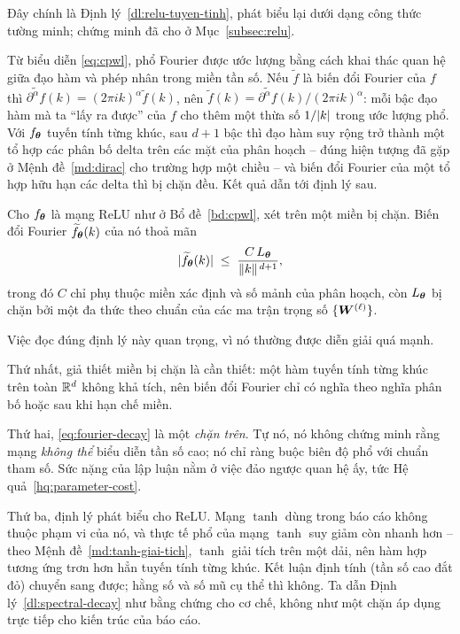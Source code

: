 Đây chính là Định lý~\ref{dl:relu-tuyen-tinh}, phát biểu lại dưới dạng công thức
tường minh; chứng minh đã cho ở Mục~\ref{subsec:relu}.
 
Từ biểu diễn \eqref{eq:cpwl}, phổ Fourier được ước lượng bằng cách khai thác
quan hệ giữa đạo hàm và phép nhân trong miền tần số. Nếu $\widetilde{f}$ là biến
đổi Fourier của $f$ thì $\widetilde{\partial^{\alpha} f}(k)
= (2\pi i k)^{\alpha}\widetilde{f}(k)$, nên
$\widetilde{f}(k) = \widetilde{\partial^{\alpha}f}(k)/(2\pi i k)^{\alpha}$: mỗi
bậc đạo hàm mà ta ``lấy ra được'' của $f$ cho thêm một thừa số $1/\lvert k\rvert$ trong
ước lượng phổ. Với $f_{\bm{\theta}}$ tuyến tính từng khúc, sau $d+1$ bậc thì đạo hàm
suy rộng trở thành một tổ hợp các phân bố delta trên các mặt của phân hoạch --
đúng hiện tượng đã gặp ở Mệnh đề~\ref{md:dirac} cho trường hợp một chiều -- và
biến đổi Fourier của một tổ hợp hữu hạn các delta thì bị chặn đều. Kết quả dẫn
tới định lý sau.
 
\begin{dinhly}
\label{dl:spectral-decay}
Cho $f_{\bm{\theta}}$ là mạng ReLU như ở Bổ đề~\ref{bd:cpwl}, xét trên một miền bị
chặn. Biến đổi Fourier $\widetilde{f}_{\bm{\theta}}(k)$ của nó thoả mãn
\begin{equation}
\lvert\widetilde{f}_{\bm{\theta}}(k)\rvert
\;\le\;
\frac{C\, L_{\bm{\theta}}}{\lVert k\rVert^{\,d+1}},
\label{eq:fourier-decay}
\end{equation}
trong đó $C$ chỉ phụ thuộc miền xác định và số mảnh của phân hoạch, còn
$L_{\bm{\theta}}$ bị chặn bởi một đa thức theo chuẩn của các ma trận trọng số
$\{\bm{W}^{(\ell)}\}$.
\end{dinhly}
 
\begin{nhanxet}
\label{nx:doc-dinh-ly-pho}
Việc đọc đúng định lý này quan trọng, vì nó thường được diễn giải quá mạnh.
 
Thứ nhất, giả thiết miền bị chặn là cần thiết: một hàm tuyến tính từng khúc trên
toàn $\mathbb{R}^d$ không khả tích, nên biến đổi Fourier chỉ có nghĩa theo nghĩa phân bố
hoặc sau khi hạn chế miền.
 
Thứ hai, \eqref{eq:fourier-decay} là một \emph{chặn trên}. Tự nó, nó không chứng
minh rằng mạng \emph{không thể} biểu diễn tần số cao; nó chỉ ràng buộc biên độ
phổ với chuẩn tham số. Sức nặng của lập luận nằm ở việc đảo ngược quan hệ ấy, tức
Hệ quả~\ref{hq:parameter-cost}.
 
Thứ ba, định lý phát biểu cho ReLU. Mạng $\tanh$ dùng trong báo cáo không thuộc
phạm vi của nó, và thực tế phổ của mạng $\tanh$ suy giảm còn nhanh hơn -- theo
Mệnh đề~\ref{md:tanh-giai-tich}, $\tanh$ giải tích trên một dải, nên hàm hợp
tương ứng trơn hơn hẳn tuyến tính từng khúc. Kết luận định tính (tần số cao đắt
đỏ) chuyển sang được; hằng số và số mũ cụ thể thì không. Ta dẫn
Định lý~\ref{dl:spectral-decay} như bằng chứng cho cơ chế, không như một chặn áp
dụng trực tiếp cho kiến trúc của báo cáo.
\end{nhanxet}
 
